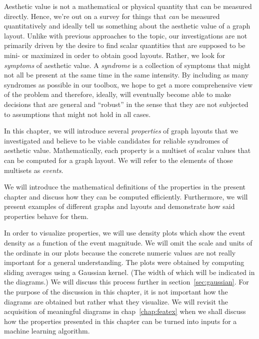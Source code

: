 \documentclass{graphstudy}
\begin{document}
Aesthetic value is not a mathematical or physical quantity that can be measured directly.  Hence, we're out on a survey
for things that \emph{can} be measured quantitatively and ideally tell us something about the aesthetic value of a graph
layout.  Unlike with previous approaches to the topic, our investigations are not primarily driven by the desire to find
scalar quantities that are supposed to be mini- or maximized in order to obtain good layouts.  Rather, we look for
\emph{symptoms} of aesthetic value.  A \emph{syndrome} is a collection of symptoms that might not all be present at the
same time in the same intensity.  By including as many syndromes as possible in our toolbox, we hope to get a more
comprehensive view of the problem and therefore, ideally, will eventually become able to make decisions that are general
and \enquote{robust} in the sense that they are not subjected to  assumptions that might not hold in
all cases.

In this chapter, we will introduce several \emph{properties} of graph layouts that we investigated and believe to be
viable candidates for reliable syndromes of aesthetic value.  Mathematically, each property is a multiset of scalar
values that can be computed for a graph layout.  We will refer to the elements of those multisets as \emph{events}.

We will introduce the mathematical definitions of the properties in the present chapter and discuss how they can be
computed efficiently.  Furthermore, we will present examples of different graphs and layouts and demonstrate how said
properties behave for them.

In order to visualize properties, we will use density plots which show the event density as a function of the event
magnitude.  We will omit the scale and units of the ordinate in our plots because the concrete numeric values are not
really important for a general understanding.  The plots were obtained by computing sliding averages using a Gaussian
kernel.  (The width of which will be indicated in the diagrams.)  We will discuss this process further in
\acl{section}~\ref{sec:gaussian}.  For the purpose of the discussion in this chapter, it is not important how the
diagrams are obtained but rather what they visualize.  We will revisit the acquisition of meaningful diagrams in
\acl{chap}~\ref{chap:featex} when we shall discuss how the properties presented in this chapter can be turned into
inputs for a machine learning algorithm.
\end{document}

